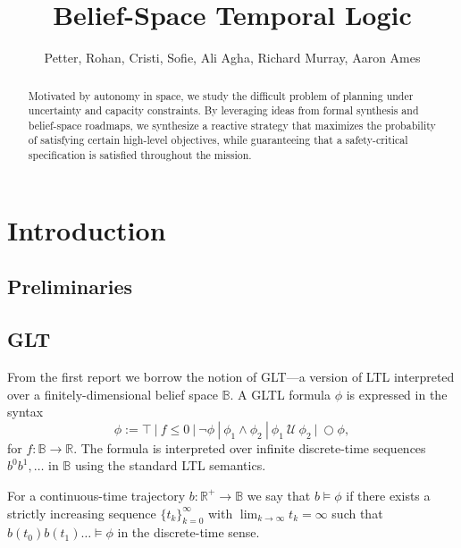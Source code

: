 \documentclass[conference]{IEEEtran}
\newcommand{\notltl}{\neg}
\newcommand{\andltl}{\wedge}
\newcommand{\Next}{\ensuremath{\bigcirc}}
\newcommand{\Until}{\ \mathcal{U}\ }
\newcommand{\True}{\top}
\begin{document}
\title{\huge Belief-Space Temporal Logic }

\author{Petter, Rohan, Cristi, Sofie, Ali Agha, Richard Murray, Aaron Ames}

\maketitle

\begin{abstract}
Motivated by autonomy in space, we study the difficult problem of planning under uncertainty and capacity constraints. By leveraging ideas from formal synthesis and belief-space roadmaps, we synthesize a reactive strategy that maximizes the probability of satisfying certain high-level objectives, while guaranteeing that a safety-critical specification is satisfied throughout the mission.  
\end{abstract}

\IEEEpeerreviewmaketitle

	

\section{Introduction}

\subsection{Preliminaries}

\subsection{GLT}

From the first report we borrow the notion of GLT---a version of LTL interpreted over a finitely-dimensional belief space $\mathbb{B}$. A GLTL formula $\phi$ is expressed in the syntax
\begin{equation}
     \phi :=  \True \ |\ f \leq 0 \ |\ \notltl \phi \ |\ \phi_1 \andltl \phi_2 \ |\ \phi_1 \Until \phi_2 \ |\ \Next \phi,
\end{equation}
for $f : \mathbb{B} \rightarrow \mathbb{R}$. The formula is interpreted over infinite discrete-time sequences $b^0 b^1, \ldots$ in $\mathbb{B}$ using the standard LTL semantics. 

For a continuous-time trajectory $b : \mathbb{R}^+ \rightarrow \mathbb{B}$ we say that $b \models \phi$ if there exists a strictly increasing sequence $\{ t_k \}_{k=0}^\infty$ with $\lim_{k \rightarrow \infty} t_k = \infty$ such that $b(t_0) b(t_1) \ldots \models \phi$ in the discrete-time sense.
\end{document}
